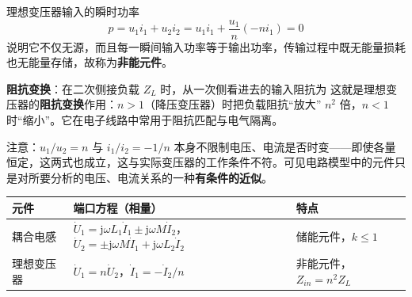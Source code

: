 理想变压器输入的瞬时功率
\begin{equation}
p=u_1i_1+u_2i_2=u_1i_1+\frac{u_1}{n}\left(-ni_1\right)=0
\end{equation}
说明它不仅无源，而且每一瞬间输入功率等于输出功率，传输过程中既无能量损耗也无能量存储，故称为\textbf{非能元件}。

\textbf{阻抗变换}：在二次侧接负载 $Z_L$ 时，从一次侧看进去的输入阻抗为
这就是理想变压器的\textbf{阻抗变换}作用：$n>1$（降压变压器）时把负载阻抗“放大” $n^2$ 倍，$n<1$ 时“缩小”。它在电子线路中常用于阻抗匹配与电气隔离。

注意：$u_1/u_2=n$ 与 $i_1/i_2=-1/n$ 本身不限制电压、电流是否时变——即使各量恒定，这两式也成立，这与实际变压器的工作条件不符。可见电路模型中的元件只是对所要分析的电压、电流关系的一种\textbf{有条件的近似}。

\begin{center}
\begin{tabular}{@{}lll@{}}
\toprule
元件 & 端口方程（相量） & 特点 \\
\midrule
耦合电感 & $\dot{U}_1=\mathrm{j}\omega L_1\dot{I}_1\pm\mathrm{j}\omega M\dot{I}_2$，$\dot{U}_2=\pm\mathrm{j}\omega M\dot{I}_1+\mathrm{j}\omega L_2\dot{I}_2$ & 储能元件，$k\le1$ \\
理想变压器 & $\dot{U}_1=n\dot{U}_2$，$\dot{I}_1=-\dot{I}_2/n$ & 非能元件，$Z_{in}=n^2Z_L$ \\
\bottomrule
\end{tabular}
\end{center}


\endinput
